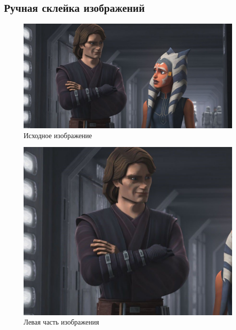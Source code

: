 \subsection{Ручная склейка изображений }
\begin{figure}[h]
    \centering
    \includegraphics[scale= 0.55]{../images/original/img_to_be_cut_and_glued.jpeg}
    \caption{Исходное изображение}
\end{figure}
\begin{figure}[h]
    \centering
    \includegraphics[scale= 0.3 ]{../images/original/glue_part_1}
    \caption{Левая часть изображения}
\end{figure}

